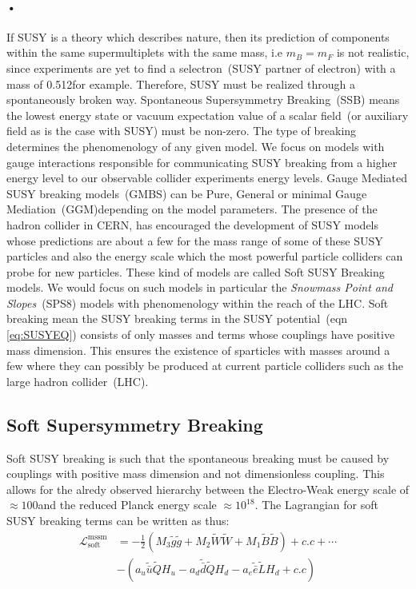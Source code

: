\paragraph*{•}
If SUSY is a theory which describes nature, then its prediction of components within the same supermultiplets with the same mass, i.e $m_{B}= m_{F}$ is not realistic, since  experiments are yet to find a selectron~(SUSY partner of electron) with a mass of 0.512\MeV for example. Therefore, SUSY must be realized through a spontaneously broken way. Spontaneous Supersymmetry Breaking~(SSB) means the lowest energy state or vacuum expectation value of a scalar field~(or auxiliary field as is the case with SUSY) must be non-zero. The type of breaking  determines the phenomenology of any given model. We focus on models with gauge interactions responsible for communicating SUSY breaking from a higher energy level to our observable collider experiments energy levels. Gauge Mediated SUSY breaking models~(GMBS) can be Pure, General or minimal Gauge Mediation~(GGM)depending on the model parameters.
The presence of the hadron collider in CERN, has encouraged the development of SUSY models whose predictions are about a few \TeV for the mass range of some of these SUSY particles and also the energy scale which the most powerful particle colliders can probe for new particles. These kind of models are called Soft SUSY Breaking models. We would focus on such models in particular the \textit{Snowmass Point and Slopes}~(SPS8) \cite{SUSY} models with phenomenology within the reach of the LHC. Soft breaking mean the SUSY breaking terms in the SUSY potential~(eqn \ref{eq:SUSYEQ}) consists of only masses and terms whose couplings have positive mass dimension. This ensures the existence of sparticles with masses around a few \TeV where they can possibly be produced at current particle colliders such as the large hadron collider~(LHC).
\subsection{Soft Supersymmetry Breaking}
Soft SUSY breaking is such that the spontaneous breaking must be caused by couplings with positive mass dimension and not dimensionless coupling. This allows for the alredy observed hierarchy between the Electro-Weak energy scale of $\approx 100$\GeV and the reduced Planck energy scale $ \approx 10^{18}$\GeV .
The Lagrangian for soft SUSY breaking terms  can be written as thus:
\begin{align}
\mathcal{L}^{\mbox{mssm}}_{\mbox{soft}} &= -\frac{1}{2}\left( M_{3}\tilde{g}\tilde{g} + M_{2}\tilde{W}\tilde{W} + M_{1}\tilde{B}\tilde{B}\right) + c.c + \cdots \\
& -\left(a_{u}\tilde{\bar{u}}\tilde{Q}H_{u} - a_{d}\tilde{\bar{d}}\tilde{Q}H_{d} - a_{e}\tilde{\bar{e}}\tilde{L}H_{d} + c.c \right)
\end{align}


